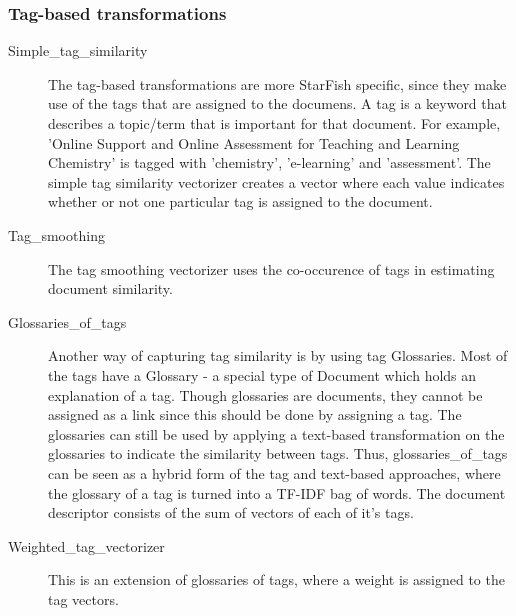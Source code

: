 \subsubsection{Tag-based transformations}
\begin{description}
\item[Simple\_tag\_similarity] The tag-based transformations are more StarFish specific, since they make use of the tags that are assigned to the documens. A tag is a keyword that describes a topic/term that is important for that document. For example, 'Online Support and Online Assessment for Teaching and Learning Chemistry' is tagged with 'chemistry', 'e-learning' and 'assessment'. The simple tag similarity vectorizer creates a vector where each value indicates whether or not one particular tag is assigned to the document. 

\item [Tag\_smoothing] The tag smoothing vectorizer uses the co-occurence of tags in estimating document similarity. %

\item [Glossaries\_of\_tags] Another way of capturing tag similarity is by using tag Glossaries. Most of the tags have a Glossary - a special type of Document which holds an explanation of a tag. Though glossaries are documents, they cannot be assigned as a link since this should be done by assigning a tag. The glossaries can still be used by applying a text-based transformation on the glossaries to indicate the similarity between tags. Thus, glossaries\_of\_tags can be seen as a hybrid form of the tag and text-based approaches, where the glossary of a tag is turned into a TF-IDF bag of words. The document descriptor consists of the sum of vectors of each of it's tags. 

\item [Weighted\_tag\_vectorizer] This is an extension of glossaries of tags, where a weight is assigned to the tag vectors. %
\end{description}

